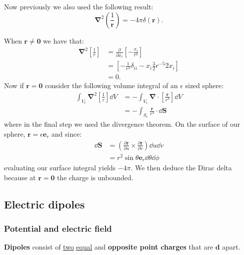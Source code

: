 \documentclass{article}
\begin{document}
Now previously we also used the following result:
$$\boldsymbol{\nabla}^2
\left(\frac{1}{\boldsymbol{r}}\right)
=-4\pi\delta(\boldsymbol{r}).$$

When $\boldsymbol{r}\neq\boldsymbol{0}$ we have that:
\begin{align*}
    \boldsymbol{\nabla}^2\left[\frac{1}{r}\right]
    &=\frac{\partial}{\partial x_i}\left[
    -\frac{x_i}{r^3}
    \right] \\
    &=\left[-\frac{1}{r^3}\delta_{ii}
    -x_i\frac{3}{2}r^{-5}2x_i\right] \\
    &=0.
\end{align*}
Now if $\boldsymbol{r}=\boldsymbol{0}$ consider the following
volume integral of an $\epsilon$ sized sphere:
\begin{align*}
    \int_{V_\epsilon}\boldsymbol{\nabla}^2\left[
    \frac{1}{r}\right]\dd V
    &=-\int_{V_\epsilon}\boldsymbol{\nabla}\cdot\left[
    \frac{\boldsymbol{r}}{r^3}\right]\dd V \\
    &=-\int_{S_\epsilon}
    \frac{\boldsymbol{r}}{r^3}\cdot
    \dd\boldsymbol{S}
\end{align*}
where in the final step we used the divergence theorem.
On the surface of our sphere, $\boldsymbol{r}
=\epsilon\boldsymbol{e}_r$ and since:
\begin{align*}
    \dd\boldsymbol{S}
    &=\left(\frac{\partial\boldsymbol{r}}
    {\partial u}\times
    \frac{\partial\boldsymbol{r}}{\partial v}\right)
    \dd u\dd v \\
    &=r^2\sin\theta\boldsymbol{e}_r\dd\theta\dd\phi
\end{align*}
evaluating our surface integral yields $-4\pi$. We then deduce
the Dirac delta because at $\boldsymbol{r}=\boldsymbol{0}$ the charge is unbounded.

\newpage

\subsection{Electric dipoles}

\subsubsection{Potential and electric field}
\textbf{Dipoles} consist of \underline{two} \underline{equal} and \textbf{opposite point charges} that are $\boldsymbol{d}$ apart. 
\end{document}
